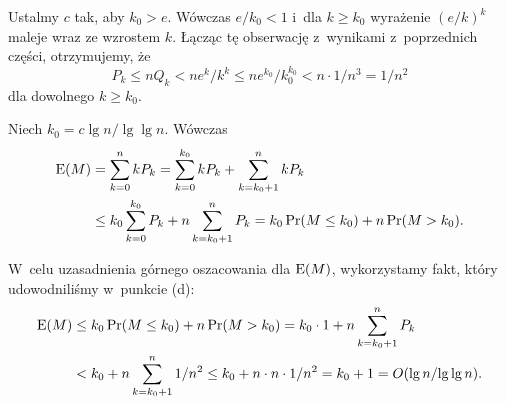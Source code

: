 Ustalmy $c$ tak, aby $k_0>e$.
Wówczas $e/k_0<1$ i~dla $k\ge k_0$ wyrażenie $(e/k)^k$ maleje wraz ze wzrostem $k$.
Łącząc tę obserwację z~wynikami z~poprzednich części, otrzymujemy, że
\[
	P_k\le nQ_k < ne^k\!/k^k \le ne^{k_0}\!/k_0^{k_0} < n\cdot1/n^3 = 1/n^2
\]
dla dowolnego $k\ge k_0$.

\subproblem %
Niech $k_0=c\lg n/\!\lg\lg n$.
Wówczas
\begin{align*}
	\operatorname{E}(M) &= \sum_{k=0}^nkP_k = \sum_{k=0}^{k_0}kP_k+\sum_{k=k_0+1}^nkP_k \\
	&\le k_0\sum_{k=0}^{k_0}P_k+n\sum_{k=k_0+1}^nP_k = k_0\Pr(M\le k_0)+n\Pr(M>k_0).
\end{align*}

W~celu uzasadnienia górnego oszacowania dla $\operatorname{E}(M)$, wykorzystamy fakt, który udowodniliśmy w~punkcie (d):
\begin{align*}
	\operatorname{E}(M) &\le k_0\Pr(M\le k_0)+n\Pr(M>k_0) = k_0\cdot1+n\sum_{k=k_0+1}^nP_k \\
	&< k_0+n\sum_{k=k_0+1}^n1/n^2 \le k_0+n\cdot n\cdot1/n^2 = k_0+1 = O(\lg n/\!\lg\lg n).
\end{align*}
